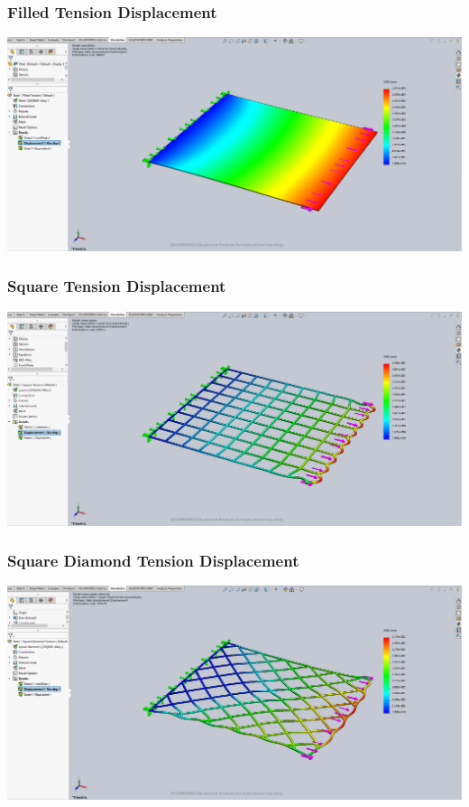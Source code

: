 \documentclass[12pt, letterpaper]{article}
\begin{document}
\begin{singlespace}
\subsubsection{Filled Tension Displacement}
\label{ap:f-te-d}
\includegraphics[width=0.8\linewidth]{./graphs/tension/filled-tension-displacement}

\subsubsection{Square Tension Displacement}
\label{ap:s-te-d}
\includegraphics[width=0.8\linewidth]{./graphs/tension/square-tension-displacement}

\subsubsection{Square Diamond Tension Displacement}
\label{ap:sd-te-d}
\includegraphics[width=0.8\linewidth]{./graphs/tension/square-diamond-tension-displacement}


\end{singlespace}
\end{document}
